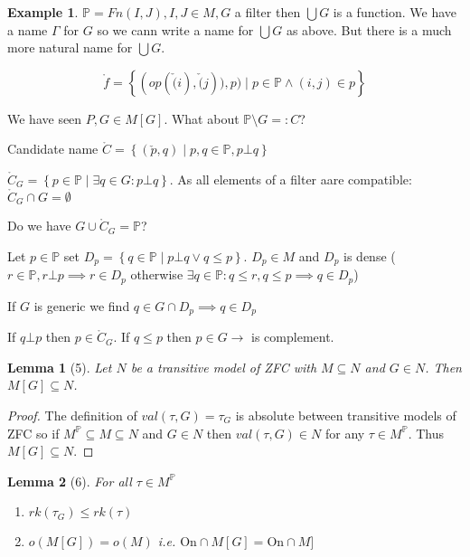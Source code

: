 \documentclass{scrartcl}
\newcommand{\set}[1]{\left\{#1\right\}}
\theoremstyle{definition}
\newtheorem*{example*}{Example}
\theoremstyle{plain}
\newtheorem*{lemma*}{Lemma}
\theoremstyle{remark}
\begin{document}
	\begin{example*}
		$\mathbb{P} = Fn(I, J), I, J \in M, G$ a filter then $\bigcup G$ is a function.
		We have a name $\Gamma$ for $G$ so we cann write a name for $\bigcup G$ as above.
		But there is a much more natural name for $\bigcup G$.

		  $$ \mathring{f} = \set{(op(\check(i), \check(j)), p) \mid p \in \mathbb{P} \land 
		  (i, j) \in p} $$
	
		We have seen $P, G \in M[G]$. What about $\mathbb{P} \setminus G =: C$?

		Candidate name $\mathring{C} = \set{(\check{p}, q) \mid p, q \in \mathbb{P}, p \bot q}$

		$\mathring{C}_G = \set{p \in \mathbb{P} \mid \exists q \in G: p \bot q}$.
		As all elements of a filter aare compatible: $\mathring{C}_G \cap G = \emptyset$

		Do we have $G \cup \mathring{C}_G = \mathbb{P}$?
		
		Let $p \in \mathbb{P}$ set $D_p = \set{q \in \mathbb{P} \mid p \bot q \lor q \leq p }$.
		$D_p \in M$ and $D_p$ is dense ($r \in \mathbb{P}, r \bot p \implies r \in D_p$
		otherwise $\exists q \in \mathbb{P}: q \leq r, q \leq p \implies q \in D_p$)

		If $G$ is generic we find $q \in G \cap D_p \implies q \in D_p$

		If $q \bot p$ then $p \in \mathring{C}_G$. If $q \leq p$ then $p \in G \longrightarrow$ is complement.		
	\end{example*}

	\begin{lemma*}[5]
		Let $N$ be a transitive model of ZFC with $M \subseteq N$ and $G \in N$. Then $M[G] \subseteq N$.
	\end{lemma*}
	
	\begin{proof}
		The definition of $val(\tau, G) = \tau_G$ is absolute between transitive models of ZFC so if $M^\mathbb{P} \subseteq M \subseteq N$ and $G \in N$ then
		$val(\tau, G) \in N$ for any $\tau \in M^\mathbb{P}$. Thus $M[G] \subseteq N$.
	\end{proof}

	\begin{lemma*}[6]
		For all $\tau \in M^\mathbb{P}$
		\begin{enumerate}[(1)]
			\item $rk(\tau_G) \leq rk(\tau)$

			\item $o(M[G]) = o(M)$ i.e. $\text{On} \cap M[G] = \text{On} \cap M]$
		\end{enumerate}
	\end{lemma*}
\end{document}
